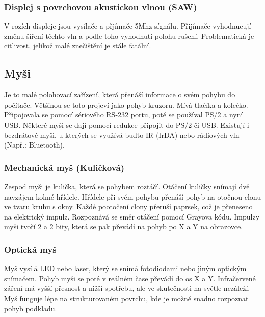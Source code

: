 \subsubsection{Displej s povrchovou akustickou vlnou (SAW)}
V rozích displeje jsou vysílače a přjímače 5Mhz sígnálu.
Přijímače vyhodnucují změnu šíření těchto vln a podle toho vyhodnutí polohu rušení.
Problematická je citlivost, jelikož malé znečištění je stále fatální.
\subsection{Myši}
Je to malé polohovací zařízení, která přenáší informace o svém pohybu do počítače.
Většinou se toto projeví jako pohyb kruzoru.
Mívá tlačíka a kolečko.
Připojovala se pomocí sériového RS-232 portu, poté se používal PS/2 a nyní USB.
Některé myši se dají pomocí redukce připojit do PS/2 či USB.
Existují i bezdrátové myši, u kterých se využívá buďto IR (IrDA) nebo rádiových vln (Např.: Bluetooth).
\subsubsection{Mechanická myš (Kuličková)}
Zespod myši je kulička, která se pohybem roztáčí.
Otáčení kuličky snímají dvě navzájem kolmé hřídele.
Hřídele při svém pohybu přenáší pohyb na otočnou clonu ve tvaru kruhu s okny.
Každé pootočení clony přeruší paprsek, což je přeneseno na elektrický impulz.
Rozpoznává se směr otáčení pomocí Grayova kódu.
Impulzy myši tvoří 2 a 2 bity, která se pak převádí na pohyb po X a Y na obrazovce.
\subsubsection{Optická myš}
Myš vysílá LED nebo laser, který se snímá fotodiodami nebo jiným optickým snímačem.
Pohyb myši se poté v reálném čase převádí do os X a Y.
Infračervené záření má vyšší přesnost a nižší spotřebu, ale ve skutečnosti na světle nezáleží.
Myš funguje lépe na strukturovaném povrchu, kde je možné snadno rozpoznat pohyb podkladu.